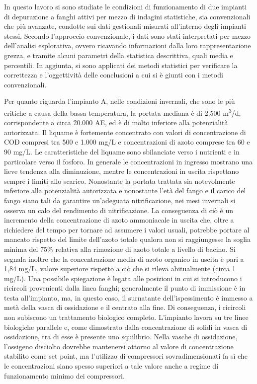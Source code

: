 In questo lavoro si sono studiate le condizioni di funzionamento di due impianti di depurazione a fanghi attivi per mezzo di indagini statistiche, sia convenzionali che più avanzate, condotte sui dati gestionali misurati all'interno degli impianti stessi.
Secondo l'approccio convenzionale, i dati sono stati interpretati per mezzo dell'analisi esplorativa, ovvero ricavando informazioni dalla loro rappresentazione grezza, e tramite alcuni parametri della statistica descrittiva, quali media e percentili. In aggiunta, si sono applicati dei metodi statistici per verificare la correttezza e l'oggettività delle conclusioni a cui si è giunti con i metodi convenzionali.

Per quanto riguarda l'impianto A, nelle condizioni invernali, che sono le più critiche a causa della bassa temperatura, la portata mediana è di 2.500 m\textsuperscript{3}/d, corrispondente a circa 20.000 AE, ed è di molto inferiore alla potenzialità autorizzata.
Il liquame è fortemente concentrato con valori di concentrazione di COD compresi tra 500 e 1.000 mg/L e concentrazioni di azoto comprese tra 60 e 90 mg/L. Le caratteristiche del liquame sono sbilanciate verso i nutrienti e in particolare verso il fosforo. In generale le concentrazioni in ingresso mostrano una lieve tendenza alla diminuzione, mentre le concentrazioni in uscita rispettano sempre i limiti allo scarico. 
Nonostante la portata trattata sia notevolmente inferiore alla potenzialità autorizzata e nonostante l'età del fango e il carico del fango siano tali da garantire un'adeguata nitrificazione, nei mesi invernali si osserva un calo del rendimento di nitrificazione. La conseguenza di ciò è un incremento della concentrazione di azoto ammoniacale in uscita che, oltre a richiedere del tempo per tornare ad assumere i valori usuali, potrebbe portare al mancato rispetto del limite dell'azoto totale qualora non si raggiungesse la soglia minima del 75\% relativa alla rimozione di azoto totale a livello di bacino.
Si segnala inoltre che la concentrazione media di azoto organico in uscita è pari a 1,84 mg/L, valore superiore rispetto a ciò che si rileva abitualmente (circa 1 mg/L). Una possibile spiegazione è legata alle posizioni in cui si introducono i ricircoli provenienti dalla linea fanghi; generalmente il punto di immissione è in testa all'impianto, ma, in questo caso, il surnatante dell'ispessimento è immesso a metà della vasca di ossidazione e il centrato alla fine. Di conseguenza, i ricircoli non subiscono un trattamento biologico completo.
L'impianto lavora su tre linee biologiche parallele e, come dimostrato dalla concentrazione di solidi in vasca di ossidazione, tra di esse è presente uno squilibrio.
Nella vasche di ossidazione, l'ossigeno disciolto dovrebbe mantenersi attorno al valore di concentrazione stabilito come set point, ma l'utilizzo di compressori sovradimensionati fa sì che le concentrazioni siano spesso superiori a tale valore anche a regime di funzionamento minimo dei compressori.

